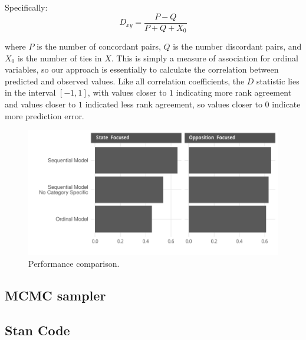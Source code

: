 Specifically:
$$D_{xy} = \frac{P - Q}{P + Q + X_0}$$

\noindent where $P$ is the number of concordant pairs, $Q$ is the number discordant pairs, and $X_0$ is the number of ties in $X$. This is simply a measure of association for ordinal variables, so our approach is essentially to calculate the correlation between predicted and observed values. Like all correlation coefficients, the $D$ statistic lies in the interval $[-1, 1]$, with values closer to $1$ indicating more rank agreement and values closer to $1$ indicated less rank agreement, so values closer to 0 indicate more prediction error.

\begin{figure}
    \centering
    \includegraphics[width=1\textwidth]{somerViz.pdf}
    \caption{Performance comparison.}
    \label{fig:somersD}
\end{figure}

\subsection*{MCMC sampler}


\subsection*{Stan Code}
